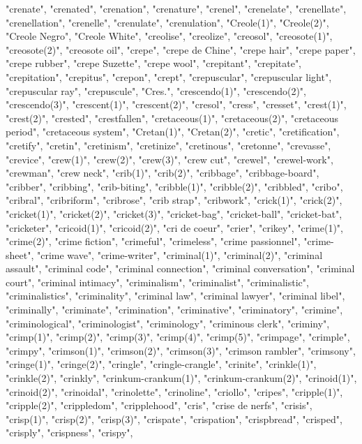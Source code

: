 "crenate",
"crenated",
"crenation",
"crenature",
"crenel",
"crenelate",
"crenellate",
"crenellation",
"crenelle",
"crenulate",
"crenulation",
"Creole(1)",
"Creole(2)",
"Creole Negro",
"Creole White",
"creolise",
"creolize",
"creosol",
"creosote(1)",
"creosote(2)",
"creosote oil",
"crepe",
"crepe de Chine",
"crepe hair",
"crepe paper",
"crepe rubber",
"crepe Suzette",
"crepe wool",
"crepitant",
"crepitate",
"crepitation",
"crepitus",
"crepon",
"crept",
"crepuscular",
"crepuscular light",
"crepuscular ray",
"crepuscule",
"Cres.",
"crescendo(1)",
"crescendo(2)",
"crescendo(3)",
"crescent(1)",
"crescent(2)",
"cresol",
"cress",
"cresset",
"crest(1)",
"crest(2)",
"crested",
"crestfallen",
"cretaceous(1)",
"cretaceous(2)",
"cretaceous period",
"cretaceous system",
"Cretan(1)",
"Cretan(2)",
"cretic",
"cretification",
"cretify",
"cretin",
"cretinism",
"cretinize",
"cretinous",
"cretonne",
"crevasse",
"crevice",
"crew(1)",
"crew(2)",
"crew(3)",
"crew cut",
"crewel",
"crewel-work",
"crewman",
"crew neck",
"crib(1)",
"crib(2)",
"cribbage",
"cribbage-board",
"cribber",
"cribbing",
"crib-biting",
"cribble(1)",
"cribble(2)",
"cribbled",
"cribo",
"cribral",
"cribriform",
"cribrose",
"crib strap",
"cribwork",
"crick(1)",
"crick(2)",
"cricket(1)",
"cricket(2)",
"cricket(3)",
"cricket-bag",
"cricket-ball",
"cricket-bat",
"cricketer",
"cricoid(1)",
"cricoid(2)",
"cri de coeur",
"crier",
"crikey",
"crime(1)",
"crime(2)",
"crime fiction",
"crimeful",
"crimeless",
"crime passionnel",
"crime-sheet",
"crime wave",
"crime-writer",
"criminal(1)",
"criminal(2)",
"criminal assault",
"criminal code",
"criminal connection",
"criminal conversation",
"criminal court",
"criminal intimacy",
"criminalism",
"criminalist",
"criminalistic",
"criminalistics",
"criminality",
"criminal law",
"criminal lawyer",
"criminal libel",
"criminally",
"criminate",
"crimination",
"criminative",
"criminatory",
"crimine",
"criminological",
"criminologist",
"criminology",
"criminous clerk",
"criminy",
"crimp(1)",
"crimp(2)",
"crimp(3)",
"crimp(4)",
"crimp(5)",
"crimpage",
"crimple",
"crimpy",
"crimson(1)",
"crimson(2)",
"crimson(3)",
"crimson rambler",
"crimsony",
"cringe(1)",
"cringe(2)",
"cringle",
"cringle-crangle",
"crinite",
"crinkle(1)",
"crinkle(2)",
"crinkly",
"crinkum-crankum(1)",
"crinkum-crankum(2)",
"crinoid(1)",
"crinoid(2)",
"crinoidal",
"crinolette",
"crinoline",
"criollo",
"cripes",
"cripple(1)",
"cripple(2)",
"crippledom",
"cripplehood",
"cris",
"crise de nerfs",
"crisis",
"crisp(1)",
"crisp(2)",
"crisp(3)",
"crispate",
"crispation",
"crispbread",
"crisped",
"crisply",
"crispness",
"crispy",
